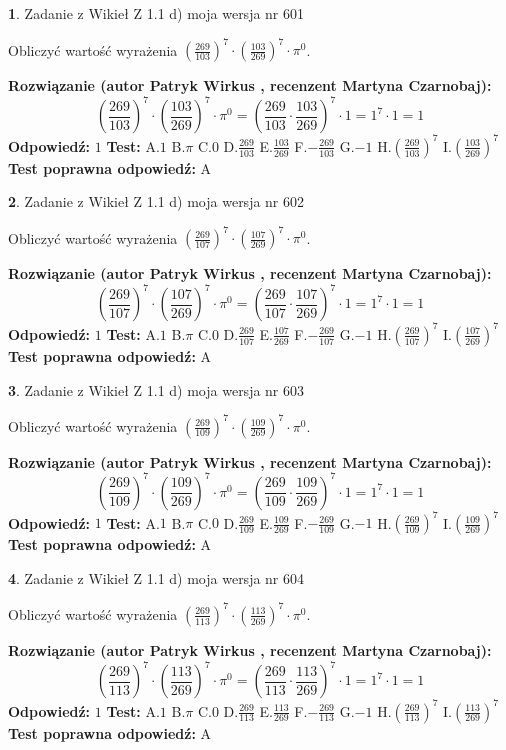 \documentclass[12pt, a4paper]{article}
\theoremstyle{definition} %
\newtheorem{zad}{}
\newcommand{\zadStart}[1]{\begin{zad}#1\newline}
\newcommand{\zadStop}{\end{zad}}
\newcommand{\rozwStart}[2]{\noindent \textbf{Rozwiązanie (autor #1 , recenzent #2): }\newline}
\newcommand{\rozwStop}{\newline}
\newcommand{\odpStart}{\noindent \textbf{Odpowiedź:}\newline}
\newcommand{\odpStop}{\newline}
\newcommand{\testStart}{\noindent \textbf{Test:}\newline}
\newcommand{\testStop}{\newline}
\newcommand{\kluczStart}{\noindent \textbf{Test poprawna odpowiedź:}\newline}
\newcommand{\kluczStop}{\newline}
\begin{document}
\zadStart{Zadanie z Wikieł Z 1.1 d) moja wersja nr 601}

Obliczyć wartość wyrażenia $(\frac{269}{103})^{7} \cdot (\frac{103}{269})^{7} \cdot \pi^{0}$.
\zadStop
\rozwStart{Patryk Wirkus}{Martyna Czarnobaj}
$$(\frac{269}{103})^{7} \cdot (\frac{103}{269})^{7} \cdot \pi^{0} = (\frac{269}{103} \cdot \frac{103}{269})^{7} \cdot 1 = 1^{7} \cdot 1 = 1$$
\rozwStop
\odpStart
$1$
\odpStop
\testStart
A.$1$ B.$\pi$ C.$0$ D.$\frac{269}{103}$ E.$\frac{103}{269}$
F.$-\frac{269}{103}$ G.$-1$
H.$(\frac{269}{103})^{7}$
I.$(\frac{103}{269})^{7}$
\testStop
\kluczStart
A
\kluczStop



\zadStart{Zadanie z Wikieł Z 1.1 d) moja wersja nr 602}

Obliczyć wartość wyrażenia $(\frac{269}{107})^{7} \cdot (\frac{107}{269})^{7} \cdot \pi^{0}$.
\zadStop
\rozwStart{Patryk Wirkus}{Martyna Czarnobaj}
$$(\frac{269}{107})^{7} \cdot (\frac{107}{269})^{7} \cdot \pi^{0} = (\frac{269}{107} \cdot \frac{107}{269})^{7} \cdot 1 = 1^{7} \cdot 1 = 1$$
\rozwStop
\odpStart
$1$
\odpStop
\testStart
A.$1$ B.$\pi$ C.$0$ D.$\frac{269}{107}$ E.$\frac{107}{269}$
F.$-\frac{269}{107}$ G.$-1$
H.$(\frac{269}{107})^{7}$
I.$(\frac{107}{269})^{7}$
\testStop
\kluczStart
A
\kluczStop



\zadStart{Zadanie z Wikieł Z 1.1 d) moja wersja nr 603}

Obliczyć wartość wyrażenia $(\frac{269}{109})^{7} \cdot (\frac{109}{269})^{7} \cdot \pi^{0}$.
\zadStop
\rozwStart{Patryk Wirkus}{Martyna Czarnobaj}
$$(\frac{269}{109})^{7} \cdot (\frac{109}{269})^{7} \cdot \pi^{0} = (\frac{269}{109} \cdot \frac{109}{269})^{7} \cdot 1 = 1^{7} \cdot 1 = 1$$
\rozwStop
\odpStart
$1$
\odpStop
\testStart
A.$1$ B.$\pi$ C.$0$ D.$\frac{269}{109}$ E.$\frac{109}{269}$
F.$-\frac{269}{109}$ G.$-1$
H.$(\frac{269}{109})^{7}$
I.$(\frac{109}{269})^{7}$
\testStop
\kluczStart
A
\kluczStop



\zadStart{Zadanie z Wikieł Z 1.1 d) moja wersja nr 604}

Obliczyć wartość wyrażenia $(\frac{269}{113})^{7} \cdot (\frac{113}{269})^{7} \cdot \pi^{0}$.
\zadStop
\rozwStart{Patryk Wirkus}{Martyna Czarnobaj}
$$(\frac{269}{113})^{7} \cdot (\frac{113}{269})^{7} \cdot \pi^{0} = (\frac{269}{113} \cdot \frac{113}{269})^{7} \cdot 1 = 1^{7} \cdot 1 = 1$$
\rozwStop
\odpStart
$1$
\odpStop
\testStart
A.$1$ B.$\pi$ C.$0$ D.$\frac{269}{113}$ E.$\frac{113}{269}$
F.$-\frac{269}{113}$ G.$-1$
H.$(\frac{269}{113})^{7}$
I.$(\frac{113}{269})^{7}$
\testStop
\kluczStart
A
\kluczStop
\end{document}
